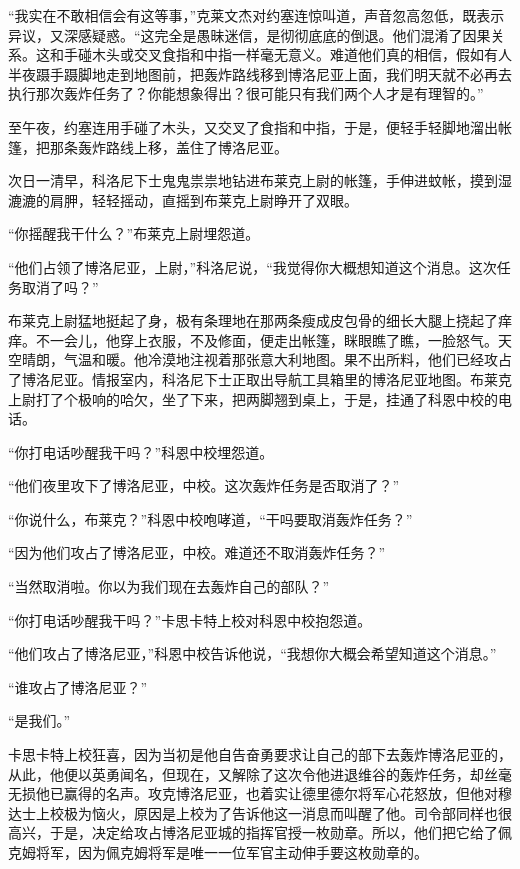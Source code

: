  


    “我实在不敢相信会有这等事，”克莱文杰对约塞连惊叫道，声音忽高忽低，既表示异议，又深感疑惑。“这完全是愚昧迷信，是彻彻底底的倒退。他们混淆了因果关系。这和手碰木头或交叉食指和中指一样毫无意义。难道他们真的相信，假如有人半夜蹑手蹑脚地走到地图前，把轰炸路线移到博洛尼亚上面，我们明天就不必再去执行那次轰炸任务了？你能想象得出？很可能只有我们两个人才是有理智的。”

    至午夜，约塞连用手碰了木头，又交叉了食指和中指，于是，便轻手轻脚地溜出帐篷，把那条轰炸路线上移，盖住了博洛尼亚。

    次日一清早，科洛尼下士鬼鬼祟祟地钻进布莱克上尉的帐篷，手伸进蚊帐，摸到湿漉漉的肩胛，轻轻摇动，直摇到布莱克上尉睁开了双眼。

    “你摇醒我干什么？”布莱克上尉埋怨道。

    “他们占领了博洛尼亚，上尉，”科洛尼说，“我觉得你大概想知道这个消息。这次任务取消了吗？”

    布莱克上尉猛地挺起了身，极有条理地在那两条瘦成皮包骨的细长大腿上挠起了痒痒。不一会儿，他穿上衣服，不及修面，便走出帐篷，眯眼瞧了瞧，一脸怒气。天空晴朗，气温和暖。他冷漠地注视着那张意大利地图。果不出所料，他们已经攻占了博洛尼亚。情报室内，科洛尼下士正取出导航工具箱里的博洛尼亚地图。布莱克上尉打了个极响的哈欠，坐了下来，把两脚翘到桌上，于是，挂通了科恩中校的电话。

    “你打电话吵醒我干吗？”科恩中校埋怨道。

    “他们夜里攻下了博洛尼亚，中校。这次轰炸任务是否取消了？”

    “你说什么，布莱克？”科恩中校咆哮道，“干吗要取消轰炸任务？”

    “因为他们攻占了博洛尼亚，中校。难道还不取消轰炸任务？”

    “当然取消啦。你以为我们现在去轰炸自己的部队？”

    “你打电话吵醒我干吗？”卡思卡特上校对科恩中校抱怨道。

    “他们攻占了博洛尼亚，”科恩中校告诉他说，“我想你大概会希望知道这个消息。”

    “谁攻占了博洛尼亚？”

    “是我们。”

    卡思卡特上校狂喜，因为当初是他自告奋勇要求让自己的部下去轰炸博洛尼亚的，从此，他便以英勇闻名，但现在，又解除了这次令他进退维谷的轰炸任务，却丝毫无损他已赢得的名声。攻克博洛尼亚，也着实让德里德尔将军心花怒放，但他对穆达士上校极为恼火，原因是上校为了告诉他这一消息而叫醒了他。司令部同样也很高兴，于是，决定给攻占博洛尼亚城的指挥官授一枚勋章。所以，他们把它给了佩克姆将军，因为佩克姆将军是唯一一位军官主动伸手要这枚勋章的。

